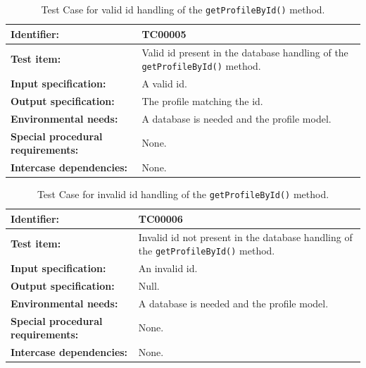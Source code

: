 \begin{table}[htbp]
	\centering
		\begin{tabular}{| p{4.5cm} | m{9cm} |}
			\hline
			\textbf{Identifier:} 					& TC00005 \\ \hline
			\textbf{Test item:}						& Valid id present in the database handling of the \texttt{getProfileById()} method. \\ \hline
			\textbf{Input specification:}			& A valid id. \\ \hline
			\textbf{Output specification:} 			& The profile matching the id. \\ \hline
			\textbf{Environmental needs:}			& A database is needed and the profile model. \\ \hline
			\textbf{Special procedural requirements:}	& None. \\ \hline
			\textbf{Intercase dependencies:}			& None. \\ \hline
		\end{tabular}
	\caption{Test Case for valid id handling of the \texttt{getProfileById()} method.}
	\label{tab:TestCase_ValidIdHandling}
\end{table}

\begin{table}[htbp]
	\centering
		\begin{tabular}{| p{4.5cm} | m{9cm} |}
			\hline
			\textbf{Identifier:} 					& TC00006 \\ \hline
			\textbf{Test item:}						& Invalid id not present in the database handling of the \texttt{getProfileById()} method. \\ \hline
			\textbf{Input specification:}			& An invalid id. \\ \hline
			\textbf{Output specification:} 			& Null. \\ \hline
			\textbf{Environmental needs:}			& A database is needed and the profile model. \\ \hline
			\textbf{Special procedural requirements:}	& None. \\ \hline
			\textbf{Intercase dependencies:}			& None. \\ \hline
		\end{tabular}
	\caption{Test Case for invalid id handling of the \texttt{getProfileById()} method.}
	\label{tab:TestCase_InvalidIdHandling}
\end{table}

